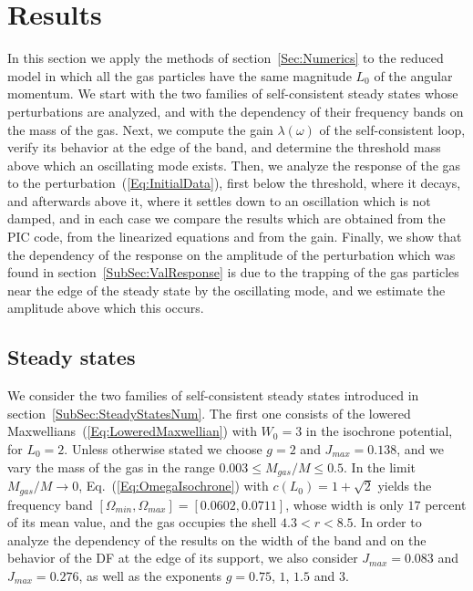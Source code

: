 \section{Results}
\label{Sec:FixedL}

In this section we apply the methods of section~\ref{Sec:Numerics} to the reduced model in which all the gas particles have the same magnitude $L_0$ of the angular momentum. We start with the two families of self-consistent steady states whose perturbations are analyzed, and with the dependency of their frequency bands on the mass of the gas. Next, we compute the gain $\lambda(\omega)$ of the self-consistent loop, verify its behavior at the edge of the band, and determine the threshold mass above which an oscillating mode exists. Then, we analyze the response of the gas to the perturbation~(\ref{Eq:InitialData}), first below the threshold, where it decays, and afterwards above it, where it settles down to an oscillation which is not damped, and in each case we compare the results which are obtained from the PIC code, from the linearized equations and from the gain. Finally, we show that the dependency of the response on the amplitude of the perturbation which was found in section~\ref{SubSec:ValResponse} is due to the trapping of the gas particles near the edge of the steady state by the oscillating mode, and we estimate the amplitude above which this occurs.


\subsection{Steady states}
\label{SubSec:FixedLStates}

We consider the two families of self-consistent steady states introduced in section~\ref{SubSec:SteadyStatesNum}. The first one consists of the lowered Maxwellians~(\ref{Eq:LoweredMaxwellian}) with $W_0 = 3$ in the isochrone potential, for $L_0 = 2$. Unless otherwise stated we choose $g = 2$ and $J_{max} = 0.138$, and we vary the mass of the gas in the range $0.003\leq M_{gas}/M\leq 0.5$. In the limit $M_{gas}/M\to 0$, Eq.~(\ref{Eq:OmegaIsochrone}) with $c(L_0) = 1 + \sqrt{2}$ yields the frequency band $[\Omega_{min},\Omega_{max}] = [0.0602,0.0711]$, whose width is only $17$ percent of its mean value, and the gas occupies the shell $4.3 < r < 8.5$. In order to analyze the dependency of the results on the width of the band and on the behavior of the DF at the edge of its support, we also consider $J_{max} = 0.083$ and $J_{max} = 0.276$, as well as the exponents $g = 0.75$, $1$, $1.5$ and $3$.

